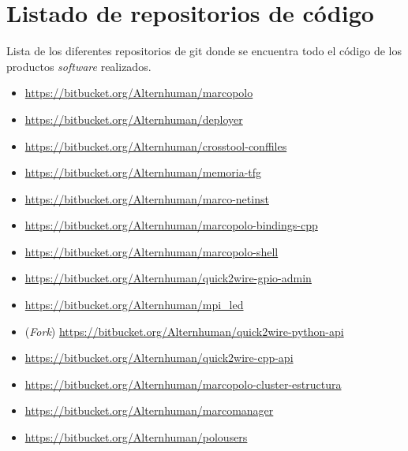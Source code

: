 \chapter{Listado de repositorios de código}
\label{repositorios}

Lista de los diferentes repositorios de git donde se encuentra todo el código de los productos \textit{software} realizados.


\begin{itemize}[noitemsep]
\item \href{https://bitbucket.org/Alternhuman/marcopolo}{https://bitbucket.org/Alternhuman/marcopolo}
\item \href{https://bitbucket.org/Alternhuman/deployer}{https://bitbucket.org/Alternhuman/deployer}
\item \href{https://bitbucket.org/Alternhuman/crosstool-conffiles}{https://bitbucket.org/Alternhuman/crosstool-conffiles}
\item \href{https://bitbucket.org/Alternhuman/memoria-tfg}{https://bitbucket.org/Alternhuman/memoria-tfg}
\item \href{https://bitbucket.org/Alternhuman/marco-netinst}{https://bitbucket.org/Alternhuman/marco-netinst}
\item \href{https://bitbucket.org/Alternhuman/marcopolo-bindings-cpp}{https://bitbucket.org/Alternhuman/marcopolo-bindings-cpp}
\item \href{https://bitbucket.org/Alternhuman/marcopolo-shell}{https://bitbucket.org/Alternhuman/marcopolo-shell}
\item \href{https://bitbucket.org/Alternhuman/quick2wire-gpio-admin}{https://bitbucket.org/Alternhuman/quick2wire-gpio-admin}
\item \href{https://bitbucket.org/Alternhuman/mpi\_led}{https://bitbucket.org/Alternhuman/mpi\_led}
\item (\textit{Fork}) \href{https://bitbucket.org/Alternhuman/quick2wire-python-api}{https://bitbucket.org/Alternhuman/quick2wire-python-api}
\item \href{https://bitbucket.org/Alternhuman/quick2wire-cpp-api}{https://bitbucket.org/Alternhuman/quick2wire-cpp-api}
\item \href{https://bitbucket.org/Alternhuman/marcopolo-cluster-estructura}{https://bitbucket.org/Alternhuman/marcopolo-cluster-estructura}
\item \href{https://bitbucket.org/Alternhuman/marcomanager}{https://bitbucket.org/Alternhuman/marcomanager}
\item \href{https://bitbucket.org/Alternhuman/polousers}{https://bitbucket.org/Alternhuman/polousers}

\end{itemize}

